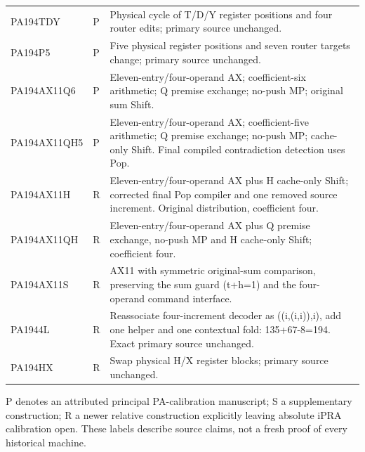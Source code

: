 \begin{longtable}{p{.22\linewidth}p{.06\linewidth}p{.63\linewidth}}
PA194TDY & P & Physical cycle of T/D/Y register positions and four router edits; primary source unchanged.\\
PA194P5 & P & Five physical register positions and seven router targets change; primary source unchanged.\\
PA194AX11Q6 & P & Eleven-entry/four-operand AX; coefficient-six arithmetic; Q premise exchange; no-push MP; original sum Shift.\\
PA194AX11QH5 & P & Eleven-entry/four-operand AX; coefficient-five arithmetic; Q premise exchange; no-push MP; cache-only Shift. Final compiled contradiction detection uses Pop.\\
PA194AX11H & R & Eleven-entry/four-operand AX plus H cache-only Shift; corrected final Pop compiler and one removed source increment. Original distribution, coefficient four.\\
PA194AX11QH & R & Eleven-entry/four-operand AX plus Q premise exchange, no-push MP and H cache-only Shift; coefficient four.\\
PA194AX11S & R & AX11 with symmetric original-sum comparison, preserving the sum guard (t+h=1) and the four-operand command interface.\\
PA1944L & R & Reassociate four-increment decoder as ((i,(i,i)),i), add one helper and one contextual fold: 135+67-8=194. Exact primary source unchanged.\\
PA194HX & R & Swap physical H/X register blocks; primary source unchanged.\\
\bottomrule\end{longtable}
P denotes an attributed principal PA-calibration manuscript; S a supplementary construction; R a newer relative construction explicitly leaving absolute iPRA calibration open. These labels describe source claims, not a fresh proof of every historical machine.
